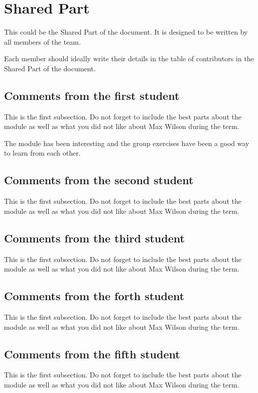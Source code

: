 \section{Shared Part}

This could be the Shared Part of the document. It is designed to be written by all members of the team.

Each member should ideally write their details in the table of contributors in the Shared Part of the document.


\subsection{Comments from the first student}
This is the first subsection. Do not forget to include the best parts about the module as well as what you did not like about Max Wilson during the term.

The module has been interesting and the group exercises have been a good way to learn from each other.

\subsection{Comments from the second student}
This is the first subsection. Do not forget to include the best parts about the module as well as what you did not like about Max Wilson during the term.

\subsection{Comments from the third student}
This is the first subsection. Do not forget to include the best parts about the module as well as what you did not like about Max Wilson during the term.

\subsection{Comments from the forth student}
This is the first subsection. Do not forget to include the best parts about the module as well as what you did not like about Max Wilson during the term.

\subsection{Comments from the fifth student}
This is the first subsection. Do not forget to include the best parts about the module as well as what you did not like about Max Wilson during the term.

